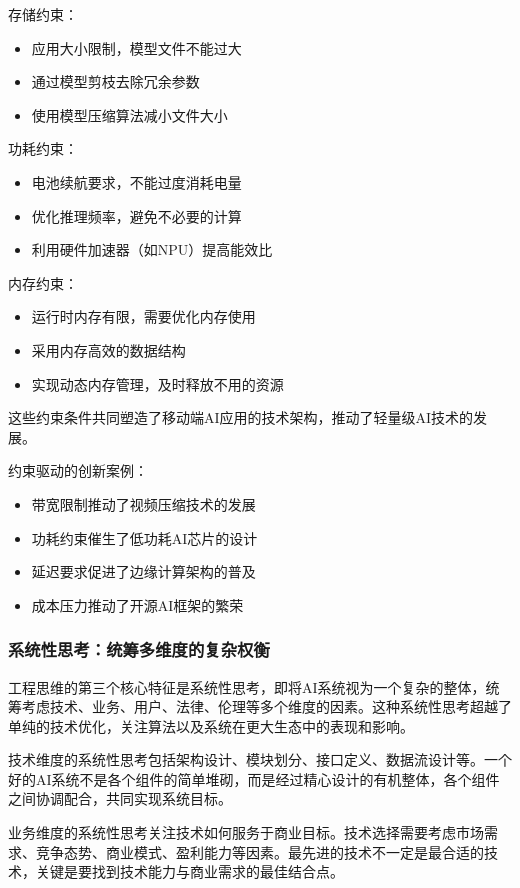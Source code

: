 存储约束：
\begin{itemize}
\item 应用大小限制，模型文件不能过大
\item 通过模型剪枝去除冗余参数
\item 使用模型压缩算法减小文件大小
\end{itemize}

功耗约束：
\begin{itemize}
\item 电池续航要求，不能过度消耗电量
\item 优化推理频率，避免不必要的计算
\item 利用硬件加速器（如NPU）提高能效比
\end{itemize}

内存约束：
\begin{itemize}
\item 运行时内存有限，需要优化内存使用
\item 采用内存高效的数据结构
\item 实现动态内存管理，及时释放不用的资源
\end{itemize}

这些约束条件共同塑造了移动端AI应用的技术架构，推动了轻量级AI技术的发展。

约束驱动的创新案例：

\begin{itemize}
\item 带宽限制推动了视频压缩技术的发展
\item 功耗约束催生了低功耗AI芯片的设计
\item 延迟要求促进了边缘计算架构的普及
\item 成本压力推动了开源AI框架的繁荣
\end{itemize}

\subsubsection{系统性思考：统筹多维度的复杂权衡}

工程思维的第三个核心特征是系统性思考，即将AI系统视为一个复杂的整体，统筹考虑技术、业务、用户、法律、伦理等多个维度的因素。这种系统性思考超越了单纯的技术优化，关注算法以及系统在更大生态中的表现和影响。

技术维度的系统性思考包括架构设计、模块划分、接口定义、数据流设计等。一个好的AI系统不是各个组件的简单堆砌，而是经过精心设计的有机整体，各个组件之间协调配合，共同实现系统目标。

业务维度的系统性思考关注技术如何服务于商业目标。技术选择需要考虑市场需求、竞争态势、商业模式、盈利能力等因素。最先进的技术不一定是最合适的技术，关键是要找到技术能力与商业需求的最佳结合点。

